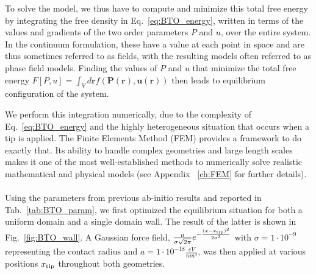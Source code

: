 To solve the model, we thus have to compute and minimize this total free energy by integrating the free density in Eq.~\eqref{eq:BTO_energy}, written in terms of the values and gradients of the two order parameters $P$ and $u$, over the entire system.
In the continuum formulation, these have a value at each point in space and are thus sometimes referred to as fields, with the resulting models often referred to as phase field models.
Finding the values of $P$ and $u$ that minimize the total free energy $F[P,u]=\int_V d\bm{r} f(\bm{P}(\bm{r}),\bm{u}(\bm{r}))$ then leads to equilibrium configuration of the system.

We perform this integration numerically, due to the complexity of Eq.~\eqref{eq:BTO_energy} and the highly heterogeneous situation that occurs when a tip is applied.
The Finite Elements Method (FEM) provides a framework to do exactly that.
Its ability to handle complex geometries and large length scales makes it one of the most well-established methods to numerically solve realistic mathematical and physical models (see Appendix ~\ref{ch:FEM} for further details).
\\\\
Using the parameters from previous ab-initio results \cite{Marton2010} and reported in Tab.~\ref{tab:BTO_param}, we first optimized the equilibrium situation for both a uniform domain and a single domain wall. The result of the latter is shown in Fig.~\ref{fig:BTO_wall}.
A Gaussian force field, $\frac{a}{\sigma \sqrt{2\pi}}e^{-\frac{(x-x_{\rm tip})^2}{2\sigma^2}}$ with $\sigma = 1 \cdot 10^{-9}$ representing the contact radius and $a = 1 \cdot 10^{-18} \frac{eV}{nm^3}$, was then applied at various positions $x_{\rm tip}$ throughout both geometries.

